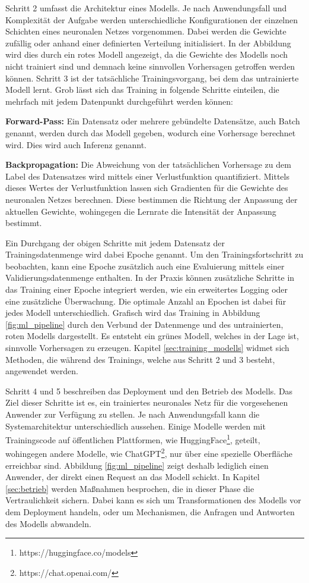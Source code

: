 Schritt 2 umfasst die Architektur eines Modells.
Je nach Anwendungsfall und Komplexität der Aufgabe werden unterschiedliche Konfigurationen der einzelnen Schichten eines neuronalen Netzes vorgenommen.
Dabei werden die Gewichte zufällig oder anhand einer definierten Verteilung initialisiert.
In der Abbildung wird dies durch ein rotes Modell angezeigt, da die Gewichte des Modells noch nicht trainiert sind und demnach keine sinnvollen Vorhersagen getroffen werden können.
Schritt 3 ist der tatsächliche Trainingsvorgang, bei dem das untrainierte Modell lernt.
Grob lässt sich das Training in folgende Schritte einteilen, die mehrfach mit jedem Datenpunkt durchgeführt werden können:
\begin{compactenum}
\item \textbf{Forward-Pass: }Ein Datensatz oder mehrere gebündelte Datensätze, auch Batch genannt, werden durch das Modell gegeben, wodurch eine Vorhersage berechnet wird. 
Dies wird auch Inferenz genannt.
\item \textbf{Backpropagation: }Die Abweichung von der tatsächlichen Vorhersage zu dem Label des Datensatzes wird mittels einer Verlustfunktion quantifiziert. Mittels dieses Wertes der Verlustfunktion lassen sich Gradienten für die Gewichte des neuronalen Netzes berechnen. Diese bestimmen die Richtung der Anpassung der aktuellen Gewichte, wohingegen die Lernrate die Intensität der Anpassung bestimmt.
\end{compactenum}
Ein Durchgang der obigen Schritte mit jedem Datensatz der Trainingsdatenmenge wird dabei Epoche genannt. 
Um den Trainingsfortschritt zu beobachten, kann eine Epoche zusätzlich auch eine Evaluierung mittels einer Validierungsdatenmenge enthalten.
In der Praxis können zusätzliche Schritte in das Training einer Epoche integriert werden, wie ein erweitertes Logging oder eine zusätzliche Überwachung.
Die optimale Anzahl an Epochen ist dabei für jedes Modell unterschiedlich.
Grafisch wird das Training in Abbildung \ref{fig:ml_pipeline} durch den Verbund der Datenmenge und des untrainierten, roten Modells dargestellt. 
Es entsteht ein grünes Modell, welches in der Lage ist, sinnvolle Vorhersagen zu erzeugen.
Kapitel \ref{sec:training_modells} widmet sich Methoden, die während des Trainings, welche aus Schritt 2 und 3 besteht, angewendet werden.

Schritt 4 und 5 beschreiben das Deployment und den Betrieb des Modells. 
Das Ziel dieser Schritte ist es, ein trainiertes neuronales Netz für die vorgesehenen Anwender zur Verfügung zu stellen.
Je nach Anwendungsfall kann die Systemarchitektur unterschiedlich aussehen. 
Einige Modelle werden mit Trainingscode auf öffentlichen Plattformen, wie HuggingFace\footnote{https://huggingface.co/models}, geteilt, wohingegen andere Modelle, wie ChatGPT\footnote{https://chat.openai.com/}, nur über eine spezielle Oberfläche erreichbar sind.
Abbildung \ref{fig:ml_pipeline} zeigt deshalb lediglich einen Anwender, der direkt einen Request an das Modell schickt.
In Kapitel \ref{sec:betrieb} werden Maßnahmen besprochen, die in dieser Phase die Vertraulichkeit sichern. 
Dabei kann es sich um Transformationen des Modells vor dem Deployment handeln, oder um Mechanismen, die Anfragen und Antworten des Modells abwandeln.